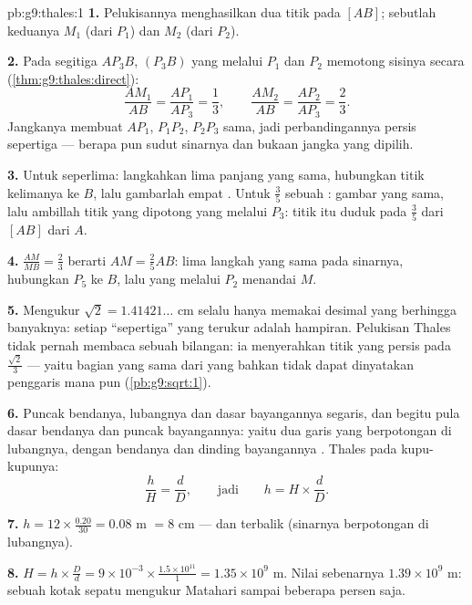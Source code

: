 \begin{solution}{pb:g9:thales:1}
\textbf{1.} Pelukisannya menghasilkan dua titik pada $[AB]$;
sebutlah keduanya $M_1$ (dari $P_1$) dan $M_2$ (dari $P_2$).

\textbf{2.} Pada segitiga $A P_3 B$, 
$(P_3 B)$ yang melalui $P_1$ dan $P_2$ memotong sisinya
secara  (\cref{thm:g9:thales:direct}):
\[
\frac{A M_1}{AB} = \frac{A P_1}{A P_3} = \frac13,
\qquad
\frac{A M_2}{AB} = \frac{A P_2}{A P_3} = \frac23 .
\]
Jangkanya membuat $A P_1$, $P_1 P_2$, $P_2 P_3$ sama, jadi
perbandingannya persis sepertiga --- berapa pun sudut sinarnya dan
bukaan jangka yang dipilih.

\textbf{3.} Untuk seperlima: langkahkan lima panjang yang sama,
hubungkan titik kelimanya ke $B$, lalu gambarlah empat .
Untuk $\frac35$ sebuah : gambar yang sama, lalu ambillah
titik yang dipotong 
yang melalui $P_3$: titik itu duduk pada $\frac{3}{5}$ dari $[AB]$ dari $A$.

\textbf{4.} $\frac{AM}{MB} = \frac23$ berarti
$AM = \frac25 AB$: lima langkah yang sama pada sinarnya, hubungkan
$P_5$ ke $B$, lalu  yang melalui $P_2$ menandai $M$.

\textbf{5.} Mengukur $\sqrt2 = 1.41421\ldots$ cm selalu hanya memakai
desimal yang berhingga banyaknya: setiap ``sepertiga'' yang terukur
adalah hampiran. Pelukisan Thales tidak pernah membaca sebuah
bilangan: ia menyerahkan titik yang persis pada $\frac{\sqrt2}{3}$ ---
yaitu bagian yang sama dari  yang bahkan tidak dapat
dinyatakan penggaris mana pun (\cref{pb:g9:sqrt:1}).

\textbf{6.} Puncak bendanya, lubangnya dan dasar bayangannya
segaris, dan begitu pula dasar bendanya dan
puncak bayangannya: yaitu dua garis yang berpotongan di lubangnya,
dengan bendanya dan dinding bayangannya . Thales pada
kupu-kupunya:
\[
\frac{h}{H} = \frac{d}{D},
\qquad\text{jadi}\qquad
h = H \times \frac dD .
\]

\textbf{7.} $h = 12 \times \frac{0.20}{30} = 0.08$ m $= 8$ cm
--- dan terbalik (sinarnya berpotongan di lubangnya).

\textbf{8.} $H = h \times \frac Dd = 9 \times 10^{-3} \times
\frac{1.5 \times 10^{11}}{1} = 1.35 \times 10^{9}$ m. Nilai
sebenarnya $1.39 \times 10^9$ m: sebuah kotak sepatu mengukur
Matahari sampai  beberapa persen saja.


\end{solution}
